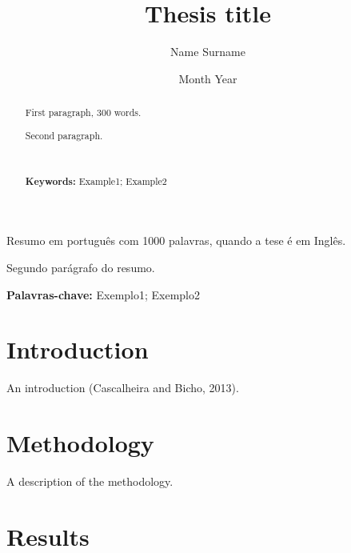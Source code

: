 \documentclass[12pt,twoside]{reedthesis}
\title{Thesis title}
\author{Name Surname}
\date{Month Year}
\begin{document}

  \maketitle


\frontmatter %


  \begin{abstract}
    First paragraph, 300 words.
    
    \par
    
    Second paragraph.
    
    ~
    
    \textbf{Keywords:} Example1; Example2
  \end{abstract}
  \begin{resumo}
    Resumo em português com 1000 palavras, quando a tese é em Inglês.
    
    \par
    
    Segundo parágrafo do resumo.
    
    \textbf{Palavras-chave:} Exemplo1; Exemplo2
  \end{resumo}
  \hypersetup{linkcolor=black}
  \setcounter{tocdepth}{2}
  \tableofcontents

  \listoftables

  \listoffigures


\mainmatter %
\pagestyle{fancyplain} %

\hypertarget{introduction}{%
\chapter{Introduction}\label{introduction}}

An introduction (Cascalheira and Bicho, 2013).

\hypertarget{methodology}{%
\chapter{Methodology}\label{methodology}}

A description of the methodology.

\hypertarget{results}{%
\chapter{Results}\label{results}}
\end{document}
